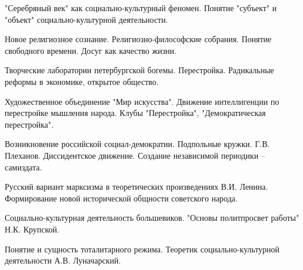 \documentclass[
	14pt,
	a4paper,
	]
	{scrartcl}
\begin{document}
\newpage


\shapk
{}
\setcounter{zad}{0}

\vfill
\z "Серебряный век" как социально-культурный феномен.
 \vfill
\z Понятие "субъект" и "объект" социально-культурной деятельности.
 \vfill

\vfill

\newpage


\shapk
{}
\setcounter{zad}{0}

\vfill
\z Новое религиозное сознание. Религиозно-философские собрания.
 \vfill
\z Понятие свободного времени. Досуг как качество жизни.
 \vfill

\vfill

\newpage


\shapk
{}
\setcounter{zad}{0}

\vfill
\z Творческие лаборатории петербургской богемы.
 \vfill
\z Перестройка. Радикальные реформы в экономике, открытое общество.
 \vfill

\vfill

\newpage


\shapk
{}
\setcounter{zad}{0}

\vfill
\z Художественное объединение "Мир искусства".
 \vfill
\z Движение интеллигенции по перестройке мышления народа. Клубы "Перестройка", "Демократическая перестройка".
 \vfill

\vfill

\newpage


\shapk
{}
\setcounter{zad}{0}

\vfill
\z Возникновение российской социал-демократии. Подпольные кружки. Г.В. Плеханов.
 \vfill
\z Диссидентское движение. Создание независимой периодики – самиздата.
 \vfill

\vfill

\newpage


\shapk
{}
\setcounter{zad}{0}

\vfill
\z Русский вариант марксизма в теоретических произведениях В.И. Ленина.
 \vfill
\z Формирование новой исторической общности советского народа.
 \vfill

\vfill

\newpage


\shapk
{}
\setcounter{zad}{0}

\vfill
\z Социально-культурная деятельность большевиков.
 \vfill
\z "Основы политпросвет работы" Н.К. Крупской.
 \vfill

\vfill

\newpage


\shapk
{}
\setcounter{zad}{0}

\vfill
\z Понятие и сущность тоталитарного режима.
 \vfill
\z Теоретик социально-культурной деятельности А.В. Луначарский.
 \vfill

\vfill

\newpage
\end{document}
